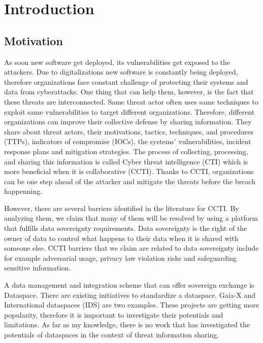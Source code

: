 \documentclass{article}
\begin{document}
\section{Introduction} %

\subsection{Motivation}




As soon new software get deployed, its vulnerabilities get exposed to the attackers. Due to digitalizations new software is constantly being deployed, therefore organizations face constant challenge of protecting their systems and data from cyberattacks. One thing that can help them, however, is the fact that these threats are interconnected. Same threat actor often uses same techniques to exploit same vulnerabilities to target different organizations. Therefore, different organizations can improve their collective defense by sharing information. They share about threat actors, their motivations, tactics, techniques, and procedures (TTPs), indicators of compromise (IOCs), the systems' vulnerabilities, incident response plans and mitigation strategies. The process of collecting, processing, and sharing this information is called Cyber threat intelligence (CTI) which is more beneficial when it is collaborative (CCTI). Thanks to CCTI, organizations can be one step ahead of the attacker and mitigate the threats before the breach happenning.


However, there are several barriers identified in the literature \cite{zibak_cyber_2019} for CCTI. %
By analyzing them, we claim that many of them will be resolved by using a platform that fulfills data sovereignty requirements. Data sovereignty is the right of the owner of data to control what happens to their data when it is shared with someone else.
CCTI barriers that we claim are related to data sovereignty include for example adversarial usage, privacy law violation risks and safeguarding sensitive information.


A data management and integration scheme that can offer sovereign exchange is Dataspace. There are existing initiatives to standardize a dataspace. Gaia-X and International dataspaces (IDS) are two examples. These projects are getting more popularity, therefore it is important to investigate their potentials and limitations. As far as my knowledge, there is no work that has investigated the potentials of dataspaces in the context of threat information sharing. 
\end{document}
